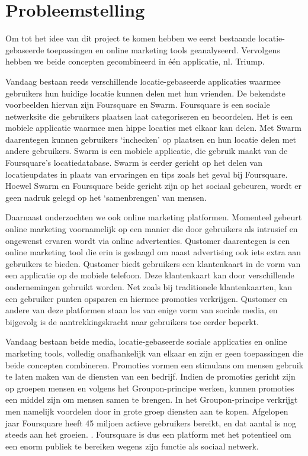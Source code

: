\chapter{Probleemstelling}
Om tot het idee van dit project te komen hebben we eerst bestaande locatie-gebaseerde toepassingen en online marketing tools geanalyseerd. Vervolgens hebben we beide concepten gecombineerd in één applicatie, nl. Triump.

Vandaag bestaan reeds verschillende locatie-gebaseerde applicaties waarmee gebruikers hun huidige locatie kunnen delen met hun vrienden. 
De bekendste voorbeelden hiervan zijn Foursquare\cite{foursquare} en Swarm\cite{swarm}.
Foursquare is een sociale netwerksite die gebruikers plaatsen laat categoriseren en beoordelen.
Het is een mobiele applicatie waarmee men hippe locaties met elkaar kan delen. Met Swarm daarentegen kunnen gebruikers `inchecken' op plaatsen en hun locatie delen met andere gebruikers. Swarm is een mobiele applicatie, die gebruik maakt van de Foursquare's locatiedatabase. Swarm is eerder gericht op het delen van locatieupdates in plaats van ervaringen en tips zoals het geval bij Foursquare.
Hoewel Swarm en Foursquare beide gericht zijn op het sociaal gebeuren, wordt er geen nadruk gelegd op het `samenbrengen' van mensen. 

Daarnaast onderzochten we ook online marketing platformen. Momenteel gebeurt online marketing voornamelijk op een manier die door gebruikers als intrusief en ongewenst ervaren wordt via online advertenties. Qustomer\cite{qustomer} daarentegen is een online marketing tool die erin is geslaagd om naast advertising ook iets extra aan gebruikers te bieden. Qustomer biedt gebruikers een klantenkaart in de vorm van een applicatie op de mobiele telefoon. Deze klantenkaart kan door verschillende ondernemingen gebruikt worden. Net zoals bij traditionele klantenkaarten, kan een gebruiker punten opsparen en hiermee promoties verkrijgen. Qustomer en andere van deze platformen staan los van enige vorm van sociale media, en bijgevolg is de aantrekkingskracht naar gebruikers toe eerder beperkt.

Vandaag bestaan beide media, locatie-gebaseerde sociale applicaties en online marketing tools, volledig onafhankelijk van elkaar en zijn er geen toepassingen die beide concepten combineren. 
Promoties vormen een stimulans om mensen gebruik te laten maken van de diensten van een bedrijf. Indien de promoties gericht zijn op groepen mensen en volgens het Groupon-principe werken, kunnen promoties een middel zijn om mensen samen te brengen.
In het Groupon-principe verkrijgt men namelijk voordelen door in grote groep diensten aan te kopen.
Afgelopen jaar Foursquare heeft 45 miljoen actieve gebruikers bereikt, en dat aantal is nog steeds aan het groeien. \cite{users}. Foursquare is dus een platform met het potentieel om een enorm publiek te bereiken wegens zijn functie als sociaal netwerk. 

